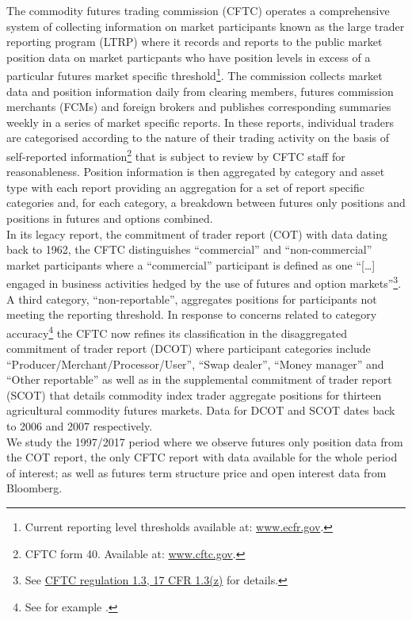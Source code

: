 \documentclass[12pt,]{article}
\let\rmarkdownfootnote\footnote%
\def\footnote{\protect\rmarkdownfootnote}
\begin{document}
The commodity futures trading commission (CFTC) operates a comprehensive
system of collecting information on market participants known as the
large trader reporting program (LTRP) where it records and reports to
the public market position data on market particpants who have position
levels in excess of a particular futures market specific
threshold\footnote{Current reporting level thresholds available at:
  \href{https://www.ecfr.gov/cgi-bin/retrieveECFR?gp=\&SID=970471b8455f4bab7db4110cfde50731\&mc=true\&r=SECTION\&n=se17.1.15_103}{www.ecfr.gov}.}.
The commission collects market data and position information daily from
clearing members, futures commission merchants (FCMs) and foreign
brokers and publishes corresponding summaries weekly in a series of
market specific reports. In these reports, individual traders are
categorised according to the nature of their trading activity on the
basis of self-reported information\footnote{CFTC form 40. Available at:
  \href{https://www.cftc.gov/sites/default/files/idc/groups/public/@forms/documents/file/cftcform40.pdf}{www.cftc.gov}.}
that is subject to review by CFTC staff for reasonableness. Position
information is then aggregated by category and asset type with each
report providing an aggregation for a set of report specific categories
and, for each category, a breakdown between futures only positions and
positions in futures and options combined.\\
In its legacy report, the commitment of trader report (COT) with data
dating back to 1962, the CFTC distinguishes ``commercial'' and
``non-commercial'' market participants where a ``commercial''
participant is defined as one ``{[}\ldots{}{]} engaged in business
activities hedged by the use of futures and option markets''\footnote{See
  \href{https://www.gpo.gov/fdsys/pkg/CFR-1998-title17-vol1/xml/CFR-1998-title17-vol1-sec1-3.xml}{CFTC
  regulation 1.3, 17 CFR 1.3(z)} for details.}. A third category,
``non-reportable'', aggregates positions for participants not meeting
the reporting threshold. In response to concerns related to category
accuracy\footnote{See for example \citet{ederington_who_2002}.} the CFTC
now refines its classification in the disaggregated commitment of trader
report (DCOT) where participant categories include
``Producer/Merchant/Processor/User'', ``Swap dealer'', ``Money manager''
and ``Other reportable'' as well as in the supplemental commitment of
trader report (SCOT) that details commodity index trader aggregate
positions for thirteen agricultural commodity futures markets. Data for
DCOT and SCOT dates back to 2006 and 2007 respectively.\\
We study the 1997/2017 period where we observe futures only position
data from the COT report, the only CFTC report with data available for
the whole period of interest; as well as futures term structure price
and open interest data from Bloomberg.
\end{document}
